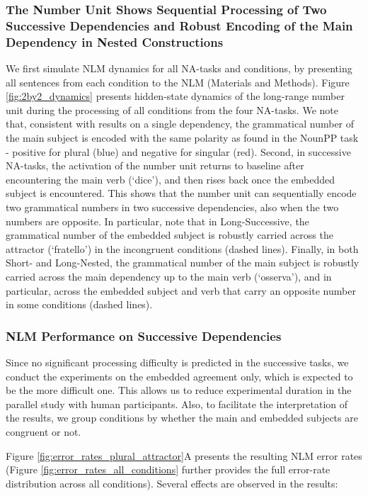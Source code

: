 \subsubsection{The Number Unit Shows Sequential Processing of Two Successive Dependencies and Robust Encoding of the Main Dependency in Nested Constructions}
We first simulate NLM dynamics for all NA-tasks and conditions, by presenting all sentences from each condition to the NLM (Materials and Methods). Figure \ref{fig:2by2_dynamics} presents hidden-state dynamics of the long-range number unit during the processing of all conditions from the four NA-tasks. We note that, consistent with results on a single dependency, the grammatical number of the main subject is encoded with the same polarity as found in the NounPP task - positive for plural (blue) and negative for singular (red). Second, in successive NA-tasks, the activation of the number unit returns to baseline after encountering the main verb (`dice'), and then rises back once the embedded subject is encountered. This shows that the number unit can sequentially encode two grammatical numbers in two successive dependencies, also when the two numbers are opposite. In particular, note that in Long-Successive, the grammatical number of the embedded subject is robustly carried across the attractor (`fratello') in the incongruent conditions (dashed lines). Finally, in both Short- and Long-Nested, the grammatical number of the main subject is robustly carried across the main dependency up to the main verb (`osserva'), and in particular, across the embedded subject and verb that carry an opposite number in some conditions (dashed lines).

\subsubsection{NLM Performance on Successive Dependencies}
Since no significant processing difficulty is predicted in the successive tasks, we conduct the experiments on the embedded agreement only, which is expected to be the more difficult one. 
This allows us to reduce experimental duration in the parallel study with human participants. Also, to facilitate the interpretation of the results, we group conditions by whether the main and embedded subjects are congruent or not.

Figure \ref{fig:error_rates_plural_attractor}A presents the resulting NLM error rates (Figure \ref{fig:error_rates_all_conditions} further provides the full error-rate distribution across all conditions). Several effects are observed in the results: 

